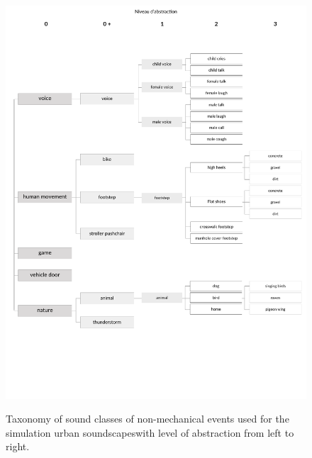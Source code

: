 \documentclass[12pt]{elsarticle}
\providecommand{\DIFadd}[1]{{\protect\color{blue}\uwave{#1}}} %
\providecommand{\DIFaddFL}[1]{\DIFadd{#1}} %
\providecommand{\DIFaddbeginFL}{} %
\providecommand{\DIFaddendFL}{} %
\begin{document}
\begin{figure}[hp]
    \centering
        {\includegraphics[trim={ 0 0 0cm 1cm},clip,width=.9\columnwidth]{gfx/appendix/event_2_en}\label{fig:taxonomieEventb}}
       \caption{Taxonomy of sound classes of non-mechanical events used for the simulation \DIFaddbeginFL \DIFaddFL{of }\DIFaddendFL urban soundscapes\DIFaddbeginFL \DIFaddFL{, }\DIFaddendFL with level of abstraction from left to right.}
       \label{fig:taxonomieEb}
\end{figure}
\end{document}
